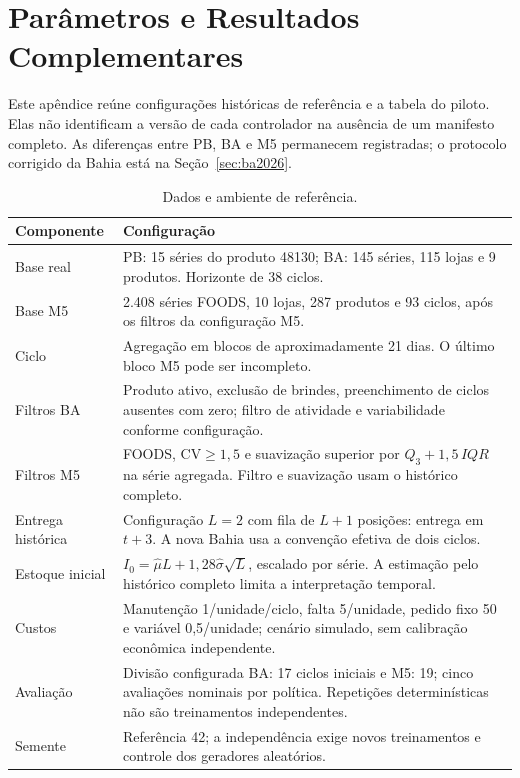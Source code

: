 \appendix
\chapter{Parâmetros e Resultados Complementares}
\label{app:reproducibility}
\renewcommand{\thetable}{A.\arabic{table}}
\setcounter{table}{0}

Este apêndice reúne configurações históricas de referência e a tabela do piloto. Elas não identificam a versão de cada controlador na ausência de um manifesto completo. As diferenças entre PB, BA e M5 permanecem registradas; o protocolo corrigido da Bahia está na Seção~\ref{sec:ba2026}.

\begin{table}[htbp]\centering\small
\caption{Dados e ambiente de referência.}\label{tab:global_params}
\begin{tabular}{@{}p{3cm}p{11.4cm}@{}}\toprule
\textbf{Componente} & \textbf{Configuração}\\\midrule
Base real & PB: 15 séries do produto 48130; BA: 145 séries, 115 lojas e 9 produtos. Horizonte de 38 ciclos.\\
Base M5 & 2.408 séries FOODS, 10 lojas, 287 produtos e 93 ciclos, após os filtros da configuração M5.\\
Ciclo & Agregação em blocos de aproximadamente 21 dias. O último bloco M5 pode ser incompleto.\\
Filtros BA & Produto ativo, exclusão de brindes, preenchimento de ciclos ausentes com zero; filtro de atividade e variabilidade conforme configuração.\\
Filtros M5 & FOODS, CV$\geq1,5$ e suavização superior por $Q_3+1,5\,IQR$ na série agregada. Filtro e suavização usam o histórico completo.\\
Entrega histórica & Configuração $L=2$ com fila de $L+1$ posições: entrega em $t+3$. A nova Bahia usa a convenção efetiva de dois ciclos.\\
Estoque inicial & $I_0=\hat\mu L+1{,}28\hat\sigma\sqrt L$, escalado por série. A estimação pelo histórico completo limita a interpretação temporal.\\
Custos & Manutenção 1/unidade/ciclo, falta 5/unidade, pedido fixo 50 e variável 0,5/unidade; cenário simulado, sem calibração econômica independente.\\
Avaliação & Divisão configurada BA: 17 ciclos iniciais e M5: 19; cinco avaliações nominais por política. Repetições determinísticas não são treinamentos independentes.\\
Semente & Referência 42; a independência exige novos treinamentos e controle dos geradores aleatórios.\\
\bottomrule\end{tabular}\end{table}

